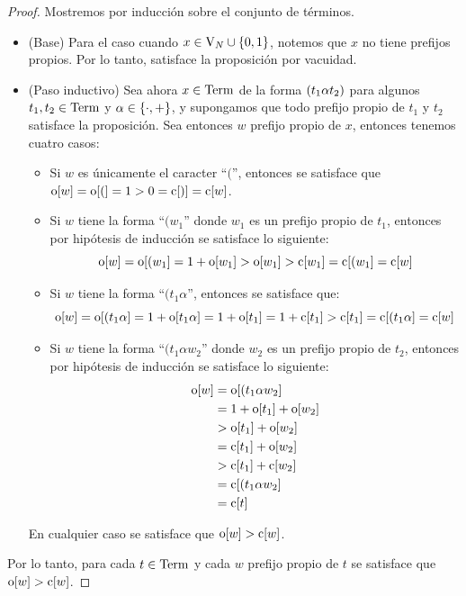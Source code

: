 \begin{proof}
	Mostremos por inducción sobre el conjunto de términos. 
	\begin{itemize}
		\item (Base) Para el caso cuando $x\in\VARIABLES[N]\cup\set*{0, 1}$, notemos que $x$ no tiene prefijos propios. Por lo tanto, satisface la proposición por vacuidad.
		\item (Paso inductivo) Sea ahora $x\in\TERMINOS$ de la forma $\pa*{t_{1}\alpha t_{2}}$ para algunos $t_{1}, t_{2}\in\TERMINOS$ y $\alpha\in\set*{\cdot, +}$, y supongamos que todo prefijo propio de $t_{1}$ y $t_{2}$ satisface la proposición. Sea entonces $w$ prefijo propio de $x$, entonces tenemos cuatro casos:
		\begin{itemize}
			\item Si $w$ es únicamente el caracter ``$($'', entonces se satisface que $\ABIERTO\bra*{w} =\ABIERTO\bra*{(} = 1 > 0 =\CERRADO\bra*{)} =\CERRADO\bra*{w}$.
			\item Si $w$ tiene la forma ``$(w_{1}$'' donde $w_{1}$ es un prefijo propio de $t_{1}$, entonces por hipótesis de inducción se satisface lo siguiente:
			\[
				\ABIERTO\bra*{w} =\ABIERTO\bra*{(w_{1}} = 1 +\ABIERTO\bra*{w_{1}} >\ABIERTO\bra*{w_{1}} >\CERRADO\bra*{w_{1}} =\CERRADO\bra*{(w_{1}} =\CERRADO\bra*{w}
			\]
			\item Si $w$ tiene la forma ``$(t_{1}\alpha$'', entonces se satisface que:
			\[
				\ABIERTO\bra*{w} =\ABIERTO\bra*{(t_{1}\alpha} = 1 +\ABIERTO\bra*{t_{1}\alpha} = 1 +\ABIERTO\bra*{t_{1}} = 1 +\CERRADO\bra*{t_{1}} >\CERRADO\bra*{t_{1}} =\CERRADO\bra*{(t_{1}\alpha} =\CERRADO\bra*{w}
			\]
			\item Si $w$ tiene la forma ``$(t_{1}\alpha w_{2}$'' donde $w_{2}$ es un prefijo propio de $t_{2}$, entonces por hipótesis de inducción se satisface lo siguiente:
			\begin{align*}
				\ABIERTO\bra*{w} &=\ABIERTO\bra*{(t_{1}\alpha w_{2}}\\
				&= 1 +\ABIERTO\bra*{t_{1}} +\ABIERTO\bra*{w_{2}}\\
				&>\ABIERTO\bra*{t_{1}} +\ABIERTO\bra*{w_{2}}\\
				&=\CERRADO\bra*{t_{1}} +\ABIERTO\bra*{w_{2}}\\
				&>\CERRADO\bra*{t_{1}} +\CERRADO\bra*{w_{2}}\\
				&=\CERRADO\bra*{(t_{1}\alpha w_{2}}\\
				&=\CERRADO\bra*{t}
			\end{align*}
		\end{itemize}
		En cualquier caso se satisface que $\ABIERTO\bra*{w} >\CERRADO\bra*{w}$.
	\end{itemize}
	Por lo tanto, para cada $t\in\TERMINOS$ y cada $w$ prefijo propio de $t$ se satisface que $\ABIERTO\bra*{w} >\CERRADO\bra*{w}$.
\end{proof}

